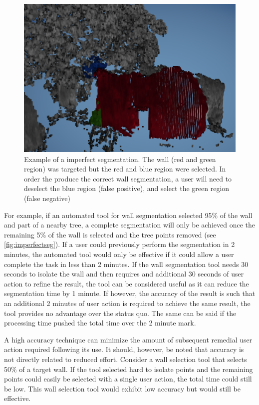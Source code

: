 \begin{figure}[ht]
  \centering
  \includegraphics[width=1\linewidth]{images/walltree.png}
  \caption[Imperfect segmentation]{Example of a imperfect segmentation. The wall (red and green region) was targeted but the red and blue region were selected. In order the produce the correct wall segmentation, a user will need to deselect the blue region (false positive), and select the green region (false negative) } 
  \label{fig:imperfectseg}
\end{figure}

For example, if an automated tool for wall segmentation selected 95\% of the wall and part of a nearby tree, a complete segmentation will only be achieved once the remaining 5\% of the wall is selected and the tree points removed (see \autoref{fig:imperfectseg}). If a user could previously perform the segmentation in 2 minutes, the automated tool would only be effective if it could allow a user complete the task in less than 2 minutes. If the wall segmentation tool needs 30 seconds to isolate the wall and then requires and additional 30 seconds of user action to refine the result, the tool can be considered useful as it can reduce the segmentation time by 1 minute. If however, the accuracy of the result is such that an additional 2 minutes of user action is required to achieve the same result, the tool provides no advantage over the status quo. The same can be said if the processing time pushed the total time over the 2 minute mark.

A high accuracy technique can minimize the amount of subsequent remedial user action required following its use. It should, however, be noted that accuracy is not directly related to reduced effort. Consider a wall selection tool that selects 50\% of a target wall. If the tool selected hard to isolate points and the remaining points could easily be selected with a single user action, the total time could still be low. This wall selection tool would exhibit low accuracy but would still be effective.


